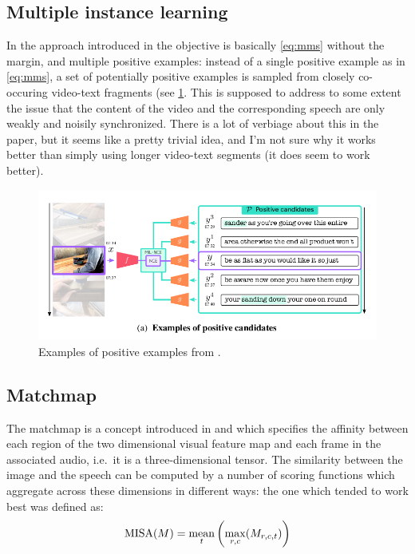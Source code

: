 \subsection{Multiple instance learning}
In the approach introduced in \citet{miech2020end} the objective is
basically \cref{eq:mms} without the margin, and multiple positive
examples: instead of a single positive example as in \cref{eq:mms}, a
set of potentially positive examples is sampled from closely
co-occuring video-text fragments (see \cref{fig:positive}. This is
supposed to address to some extent the issue that the content of the
video and the corresponding speech are only weakly and noisily
synchronized. There is a lot of verbiage about this in the paper, but
it seems like a pretty trivial idea, and I'm not sure why it works
better than simply using longer video-text segments (it does seem to
work better).
\begin{figure}
  \centering
  \includegraphics[scale=0.3]{positive}
  \caption{Examples of positive examples from \citet{miech2020end}.}
  \label{fig:positive}
\end{figure}

\subsection{Matchmap}
The matchmap is a concept introduced in \citet{harwath2018jointly} and
which specifies the affinity between each region of the two
dimensional visual feature map and each frame in the associated audio,
i.e.\ it is a three-dimensional tensor. The similarity between the
image and the speech can be computed by a number of scoring functions
which aggregate across these dimensions in different ways: the one
which tended to work best was defined as:
\begin{equation}
  \label{eq:misa}
  \mathrm{MISA}(M) = \operatorname*{mean}_t \left(\max_{r,c}(M_{r,c,t})\right)
\end{equation}

